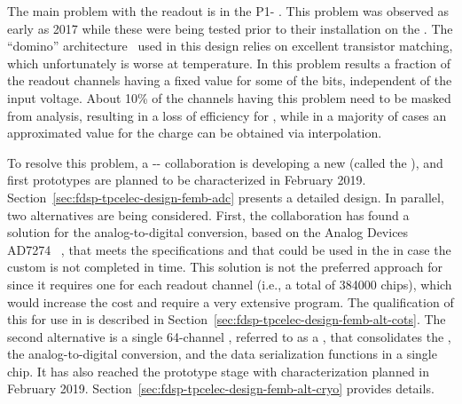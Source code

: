 The main problem with the   readout is in the
P1- . This problem was observed as early as 2017 
while these  were being tested prior to their installation
on the . The ``domino'' architecture~\cite{dominoADC} used in this design relies on
excellent transistor matching, which unfortunately 
is worse at  temperature. In  this problem
results a fraction of the readout channels having a fixed value for some of
the  bits, independent of the input voltage. About 10\%
of the channels having this problem need to be masked from analysis, 
resulting in a loss of efficiency for , 
while in a majority of cases an approximated value for the charge can
be obtained via interpolation. 

To resolve this problem, a  -- collaboration 
is developing a new   (called the 
 ), and first
prototypes are planned to be characterized in February 2019.
Section~\ref{sec:fdsp-tpcelec-design-femb-adc} presents a detailed design.  In parallel, two
alternatives are being considered. %
First, the  
collaboration has found %
a  
solution for the analog-to-digital conversion, based on the Analog 
Devices~\cite{AnalogDevices} AD7274~\cite{AD7274} , that meets 
the  specifications %
and that could be used in the  in %
case  the custom  is not %
completed in time. %
This 
solution is not the preferred approach for  since it
requires one  for each readout channel (i.e., a total
of \num{384000} chips), which would increase the cost %
and %
require a very extensive  program. The qualification
of this   for use in  is described
in Section~\ref{sec:fdsp-tpcelec-design-femb-alt-cots}. 
The second alternative is a single \num{64}-channel , referred to as a ,
that consolidates the , the analog-to-digital conversion, and the
data serialization functions %
in a single chip. %
It has also reached the prototype stage with  %
characterization planned in February 2019. %
Section~\ref{sec:fdsp-tpcelec-design-femb-alt-cryo} provides details.

